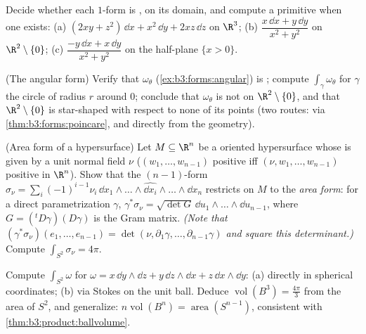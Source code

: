 \begin{exercise}[$\star\star$]\label{exo:b3:forms:3}
Decide whether each $1$-form is ,  on its domain,
and compute a primitive when one exists:
(a) $(2xy + z^2)\,\dd x + x^2\,\dd y + 2xz\,\dd z$ on
$\R^3$;
(b) $\dfrac{x\,\dd x + y\,\dd y}{x^2 + y^2}$ on
$\R^2\setminus\{0\}$;
(c) $\dfrac{-y\,\dd x + x\,\dd y}{x^2 + y^2}$ on the
half-plane $\{x > 0\}$.
\end{exercise}

\begin{exercise}[$\star\star$]\label{exo:b3:forms:4}
(The angular form) Verify that $\omega_\theta$
(\cref{ex:b3:forms:angular}) is ; compute
$\int_\gamma\omega_\theta$ for $\gamma$ the circle of radius
$r$ around $0$; conclude that $\omega_\theta$ is not 
on $\R^2\setminus\{0\}$, and that $\R^2\setminus\{0\}$ is
star-shaped with respect to none of its points (two routes:
via \cref{thm:b3:forms:poincare}, and directly from the
geometry).
\end{exercise}

\begin{exercise}[$\star\star$]\label{exo:b3:forms:5}
(Area form of a hypersurface) Let $M \subseteq \R^n$ be a
 oriented hypersurface whose  is given by
a unit normal field $\nu$ ($(w_1, \dots, w_{n-1})$ positive
iff $(\nu, w_1, \dots, w_{n-1})$ positive in $\R^n$). Show
that the $(n-1)$-form $\sigma_\nu =
\sum_i(-1)^{i-1}\nu_i\,\dd x_1\wedge\dots\wedge\widehat{\dd
x_i}\wedge\dots\wedge\dd x_n$ restricts on $M$ to the
\emph{area form}: for a direct parametrization $\gamma$,
$\gamma^*\sigma_\nu = \sqrt{\det G}\,\dd u_1\wedge\dots
\wedge\dd u_{n-1}$, where $G = ({}^t D\gamma)(D\gamma)$ is
the Gram matrix. \emph{(Note that
$(\gamma^*\sigma_\nu)(e_1, \dots, e_{n-1}) = \det(\nu,
\partial_1\gamma, \dots, \partial_{n-1}\gamma)$ and square
this determinant.)} Compute $\int_{S^2}\sigma_\nu = 4\pi$.
\end{exercise}

\begin{exercise}[$\star\star$]\label{exo:b3:forms:6}
Compute $\int_{S^2}\omega$ for $\omega = x\,\dd y\wedge\dd z
+ y\,\dd z\wedge\dd x + z\,\dd x\wedge\dd y$: (a) directly
in spherical coordinates; (b) via Stokes on the unit ball.
Deduce $\operatorname{vol}(B^3) = \frac{4\pi}3$ from the
area of $S^2$, and generalize:
$n\operatorname{vol}(B^n) = \operatorname{area}(S^{n-1})$,
consistent with \cref{thm:b3:product:ballvolume}.
\end{exercise}

